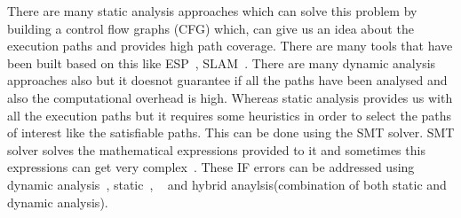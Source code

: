 There are many static analysis approaches which can solve this problem by building a control flow graphs
(CFG) which, can give us an idea about the execution paths and provides high path coverage. There are 
many tools that have been built based on this like ESP~\cite{Das:tool}, SLAM~\cite{Ball:tool}. There are 
many dynamic analysis approaches also but it doesnot guarantee if all the paths have been analysed and
also the computational overhead is high. Whereas static analysis provides us with all the execution
paths but it requires some heuristics in order to select the paths of interest like the satisfiable paths.
This can be done using the SMT solver. SMT solver solves the mathematical expressions provided
to it and sometimes this expressions can get very complex~\cite{Cadar:SMT}. These IF errors can be 
addressed using dynamic analysis~\cite{Sabelfeld:dynamic}, static~\cite{Volpano:static}, 
~\cite{Myers:static} and hybrid anaylsis(combination of both static and dynamic analysis).

